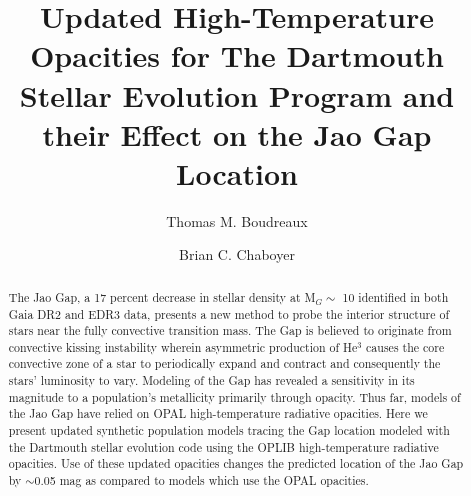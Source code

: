 \documentclass[twocolumn,linenumbers]{src/aastex631}
\begin{document}
\title{Updated High-Temperature Opacities for The Dartmouth Stellar Evolution
Program and their Effect on the Jao Gap Location}


\author[0000-0002-2600-7513]{Thomas M. Boudreaux}

\author[0000-0003-3096-4161]{Brian C. Chaboyer}


\begin{abstract}

	The Jao Gap, a 17 percent decrease in stellar density at M$_{G} \sim$ 10
	identified in both Gaia DR2 and EDR3 data, presents a new method to probe
	the interior structure of stars near the fully convective transition mass.
	The Gap is believed to originate from convective kissing instability
	wherein asymmetric production of He$^{3}$ causes the core convective zone
	of a star to periodically expand and contract and consequently the stars’
	luminosity to vary. Modeling of the Gap has revealed a sensitivity in its
	magnitude to a population’s metallicity primarily through opacity. Thus
	far, models of the Jao Gap have relied on OPAL high-temperature radiative
	opacities. Here we present updated synthetic population models tracing the
	Gap location modeled with the Dartmouth stellar evolution code using the
	OPLIB high-temperature radiative opacities. Use of these updated opacities
	changes the predicted location of the Jao Gap by $\sim$0.05 mag as compared
	to models which use the OPAL opacities.

\end{abstract}















\end{document}

